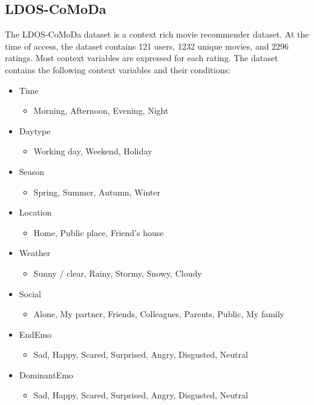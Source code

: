 \subsection{LDOS-CoMoDa}
The LDOS-CoMoDa dataset is a context rich movie recommender dataset\cite{comoda}.
At the time of access, the dataset contains 121 users, 1232 unique movies, and 2296 ratings.
Most context variables are expressed for each rating.
The dataset contains the following context variables and their conditions:
\begin{itemize}
    \item Time
    \begin{itemize}
        \item Morning, Afternoon, Evening, Night
    \end{itemize}
    \item Daytype
    \begin{itemize}
        \item Working day, Weekend, Holiday
    \end{itemize}
    \item Season
    \begin{itemize}
        \item Spring, Summer, Autumn, Winter
    \end{itemize}
    \item Location
    \begin{itemize}
        \item Home, Public place, Friend's house
    \end{itemize}
    \item Weather
    \begin{itemize}
        \item Sunny / clear, Rainy, Stormy, Snowy, Cloudy
    \end{itemize}
    \item Social
    \begin{itemize}
        \item Alone, My partner, Friends, Colleagues, Parents, Public, My family
    \end{itemize}
    \item EndEmo
    \begin{itemize}
        \item Sad, Happy, Scared, Surprised, Angry, Disgusted, Neutral
    \end{itemize}
    \item DominantEmo
    \begin{itemize}
        \item Sad, Happy, Scared, Surprised, Angry, Disgusted, Neutral

\end{itemize}
\end{itemize}
